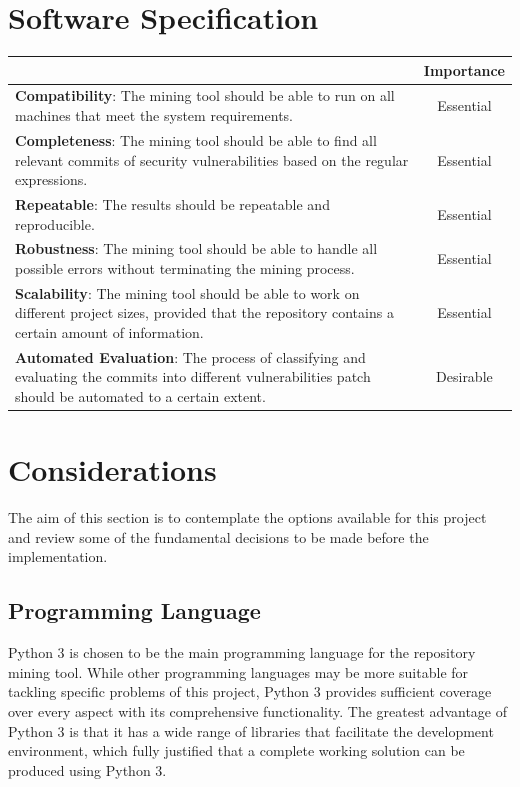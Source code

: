 \documentclass[12pt, a4paper]{report}
\begin{document}
{\section{Software Specification}
\begin{table}[H]
	\begin{center}
		\begin{tabular}{|p{10.3cm}|c|}
			\hline
			\rowcolor[HTML]{D8D8D8}
			\multicolumn{1}{|c|}{Criteria} & Importance \\ \hline
			\textbf{Compatibility}: The mining tool should be able to run on all machines that meet the
			system requirements. & Essential \\ \hline
			\textbf{Completeness}: The mining tool should be able to find all relevant commits of security
			vulnerabilities based on the regular expressions. & Essential \\ \hline
			\textbf{Repeatable}: The results should be repeatable and reproducible. & Essential \\ \hline
			\textbf{Robustness}: The mining tool should be able to handle all possible errors without
			terminating the mining process. & Essential \\ \hline
			\textbf{Scalability}: The mining tool should be able to work on different project sizes,
			provided that the repository contains a certain amount of information. & Essential \\ \hline
			\textbf{Automated Evaluation}: The process of classifying and evaluating the commits into
			different vulnerabilities patch should be automated to a certain extent. & Desirable \\ \hline
			\end{tabular}
		 \label{table:criteria}
	\end{center}
\end{table}

\section{Considerations}
The aim of this section is to contemplate the options available for this project and review some of
the fundamental decisions to be made before the implementation.

\subsection{Programming Language}
Python 3 \cite{python} is chosen to be the main programming language for the repository mining tool.
While other programming languages may be more suitable for tackling specific problems of this
project, Python 3 provides sufficient coverage over every aspect with its comprehensive
functionality. The greatest advantage of Python 3 is that it has a wide range of libraries that
facilitate the development environment, which fully justified that a complete working solution can
be produced using Python 3.

}
\end{document}
